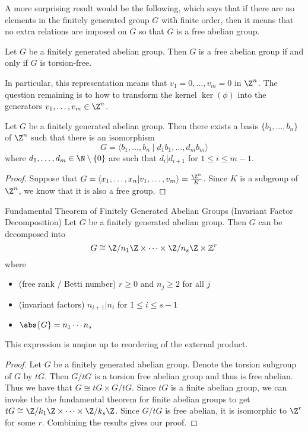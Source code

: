 \documentclass[a4paper]{article}
\begin{document}
A more surprising result would be the following, which says that if there are no elements in the finitely generated group $G$ with finite order, then it means that no extra relations are imposed on $G$ so that $G$ is a free abelian group. 

\begin{prp}{}{} Let $G$ be a finitely generated abelian group. Then $G$ is a free abelian group if and only if $G$ is torsion-free. 
\end{prp}

In particular, this representation means that $v_1=0,\dots,v_m=0$ in $\Z^n$. The question remaining is to how to transform the kernel $\ker(\phi)$ into the generators $v_1,\dots,v_m\in\Z^n$. 

\begin{prp}{}{} Let $G$ be a finitely generated abelian group. Then there exists a basis $\{b_1,\dots,b_n\}$ of $\Z^n$ such that there is an isomorphism $$G=\langle b_1,\dots,b_n\;|\;d_1b_1,\dots,d_mb_m\rangle$$ where $d_1,\dots,d_m\in\N\setminus\{0\}$ are such that $d_i|d_{i+1}$ for $1\leq i\leq m-1$. \tcbline
\begin{proof}
Suppose that $G=\langle x_1,\dots,x_n|v_1,\dots,v_m\rangle=\frac{\Z^n}{K}$. Since $K$ is a subgroup of $\Z^n$, we know that it is also a free group. 
\end{proof}
\end{prp}

\begin{thm}{Fundamental Theorem of Finitely Generated Abelian Groups (Invariant Factor Decomposition)}{} Let $G$ be a finitely generated abelian group. Then $G$ can be decomposed into $$G\cong \Z/n_1\Z\times\cdots\times\Z/n_s\Z\times\mathbb{Z}^r$$ where 
\begin{itemize}
\item (free rank / Betti number) $r\geq 0$ and $n_j\geq 2$ for all $j$
\item (invariant factors) $n_{i+1}|n_i$ for $1\leq i\leq s-1$
\item $\abs{G}=n_1\cdots n_s$
\end{itemize}
This expression is unqiue up to reordering of the external product. \tcbline
\begin{proof}
Let $G$ be a finitely generated abelian group. Denote the torsion subgroup of $G$ by $tG$. Then $G/tG$ is a torsion free abelian group and thus is free abelian. Thus we have that $G\cong tG\times G/tG$. Since $tG$ is a finite abelian group, we can invoke the the fundamental theorem for finite abelian groups to get $tG\cong\Z/k_1\Z\times\cdots\times\Z/k_s\Z$. Since $G/tG$ is free abelian, it is isomorphic to $\Z^r$ for some $r$. Combining the results gives our proof. 
\end{proof}
\end{thm}
\end{document}

